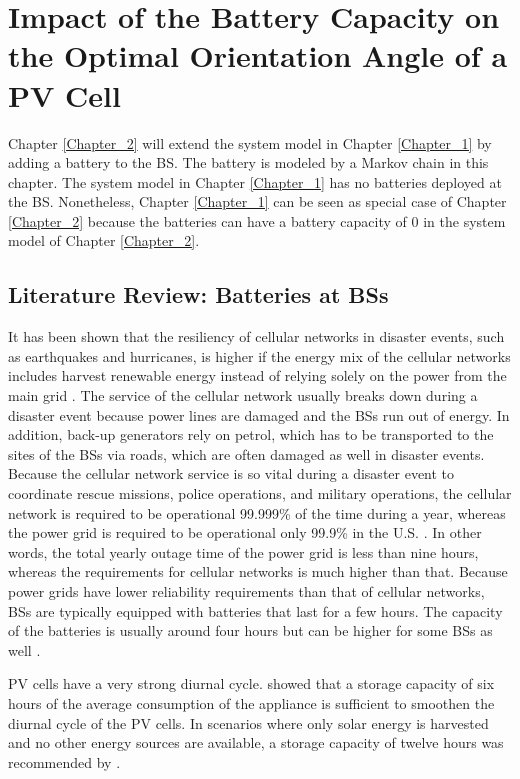 \clearpage
\chapter{Impact of the Battery Capacity on the Optimal Orientation Angle of a PV Cell\label{Chapter_2}}


Chapter \ref{Chapter_2} will extend the system model in Chapter \ref{Chapter_1} by adding a battery to the BS. The battery is modeled by a Markov chain in this chapter. The system model in Chapter \ref{Chapter_1} has no batteries deployed at the BS. Nonetheless, Chapter \ref{Chapter_1} can be seen as special case of Chapter \ref{Chapter_2} because the batteries can have a battery capacity of $0$ in the system model of Chapter \ref{Chapter_2}.



\section{Literature Review: Batteries at BSs}


It has been shown that the resiliency of cellular networks in disaster events, such as earthquakes and hurricanes, is higher if the energy mix of the cellular networks includes harvest renewable energy instead of relying solely on the power from the main grid \cite{Kwasinski2013LessonsFF}. The service of the cellular network usually breaks down during a disaster event because power lines are damaged and the BSs run out of energy. In addition, back-up generators rely on petrol, which has to be transported to the sites of the BSs via roads, which are often damaged as well in disaster events. Because the cellular network service is so vital during a disaster event to coordinate rescue missions, police operations, and military operations, the cellular network is required to be operational 99.999\% of the time during a year, whereas the power grid is required to be operational only 99.9\% in the U.S. \cite{residential}. In other words, the total yearly outage time of the power grid is less than nine hours, whereas the requirements for cellular networks is much higher than that. Because power grids have lower reliability requirements than that of cellular networks, BSs are typically equipped with batteries that last for a few hours. The capacity of the batteries is usually around four hours but can be higher for some BSs as well \cite{residential}.

PV cells have a very strong diurnal cycle. \cite{CHATTOPADHYAY2017176,RasmussenMortenGrud2012Sabs} showed that a storage capacity of six hours of the average consumption of the appliance is sufficient to smoothen the diurnal cycle of the PV cells. In scenarios where only solar energy is harvested and no other energy sources are available, a storage capacity of twelve hours was recommended by \cite{CHATTOPADHYAY2017176,RasmussenMortenGrud2012Sabs}.



